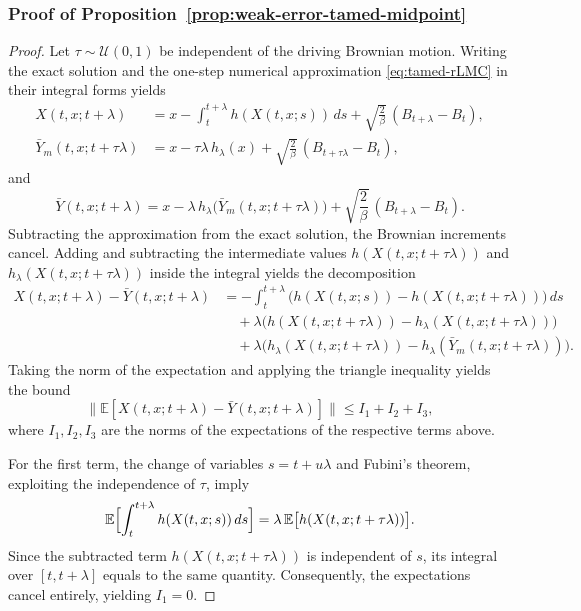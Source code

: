 \documentclass[11pt,a4paper,reqno]{amsart}
\theoremstyle{plain}
\theoremstyle{definition}
\theoremstyle{remark}
\newcommand{\E}{\mathbb{E}}
\begin{document}
\subsubsection{Proof of Proposition~\ref{prop:weak-error-tamed-midpoint}}
\label{subsec:proof-weak-error-tamed-midpoint}
\begin{proof}
Let $\tau\sim\mathcal U(0,1)$ be independent of the driving Brownian motion. Writing the exact solution and the one-step numerical approximation \eqref{eq:tamed-rLMC} in their integral forms yields
\begin{align*}
  X(t,x;t+\lambda) &= x-\int_t^{t+\lambda} h(X(t,x;s))\,ds +\sqrt{\frac{2}{\beta}}\,(B_{t+\lambda}-B_t),\\
  \bar Y_m(t,x;t+\tau\lambda) &= x-\tau\lambda\,h_\lambda(x)+\sqrt{\frac{2}{\beta}}\,(B_{t+\tau\lambda}-B_t),
\end{align*}
and
\begin{equation}\label{eq:tamed-midpoint-one-step}
  \bar Y(t,x;t+\lambda) = x-\lambda\,h_\lambda\bigl(\bar Y_m(t,x;t+\tau\lambda)\bigr) +\sqrt{\frac{2}{\beta}}\,(B_{t+\lambda}-B_t).
\end{equation}
Subtracting the approximation from the exact solution, the Brownian increments cancel. Adding and subtracting the intermediate values $h(X(t,x;t+\tau\lambda))$ and $h_\lambda(X(t,x;t+\tau\lambda))$ inside the integral yields the decomposition
\begin{equation}\label{eq:weak-decomp-noProj}
\begin{aligned}
  X(t,x;t+\lambda)-\bar Y(t,x;t+\lambda) &= -\int_t^{t+\lambda}\bigl(h(X(t,x;s))-h(X(t,x;t+\tau\lambda))\bigr)\,ds\\
  &\quad +\lambda\bigl(h(X(t,x;t+\tau\lambda))-h_\lambda(X(t,x;t+\tau\lambda))\bigr)\\
  &\quad +\lambda\bigl(h_\lambda(X(t,x;t+\tau\lambda))-h_\lambda(\bar Y_m(t,x;t+\tau\lambda))\bigr).
\end{aligned}
\end{equation}
Taking the norm of the expectation and applying the triangle inequality yields the bound
\[
  \bigl\|\E[X(t,x;t+\lambda)-\bar Y(t,x;t+\lambda)]\bigr\| \le I_1+I_2+I_3,
\]
where $I_1, I_2, I_3$ are the norms of the expectations of the respective terms above.

For the first term, the change of variables $s=t+u\lambda$ and Fubini's theorem, exploiting the independence of $\tau$, imply
\[
  \E\Bigl[\int_t^{t+\lambda}h(X(t,x;s))\,ds\Bigr] = \lambda\,\E\bigl[h(X(t,x;t+\tau\lambda))\bigr].
\]
Since the subtracted term $h(X(t,x;t+\tau\lambda))$ is independent of $s$, its integral over $[t, t+\lambda]$ equals to the same quantity. Consequently, the expectations cancel entirely, yielding $I_1=0$.


\end{proof}
\end{document}

